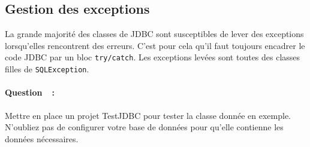 \documentclass[a4paper,11pt]{article}
\newcounter{compteurQuestion}
\newcommand{\Question}{\paragraph*{Question~\thecompteurQuestion~:}\addtocounter{compteurQuestion}{1}}
\begin{document}
\subsection{Gestion des exceptions}
La grande majorité des classes de JDBC sont susceptibles de lever des exceptions lorsqu'elles 
rencontrent des erreurs. C'est pour cela qu'il faut toujours encadrer le code JDBC par un 
bloc \texttt{try/catch}. Les exceptions levées sont toutes des classes filles de \texttt{SQLException}.

\Question Mettre en place un projet TestJDBC pour tester la classe donnée en exemple. 
N'oubliez pas de configurer votre base de données pour qu'elle contienne les données nécessaires.
\end{document}

